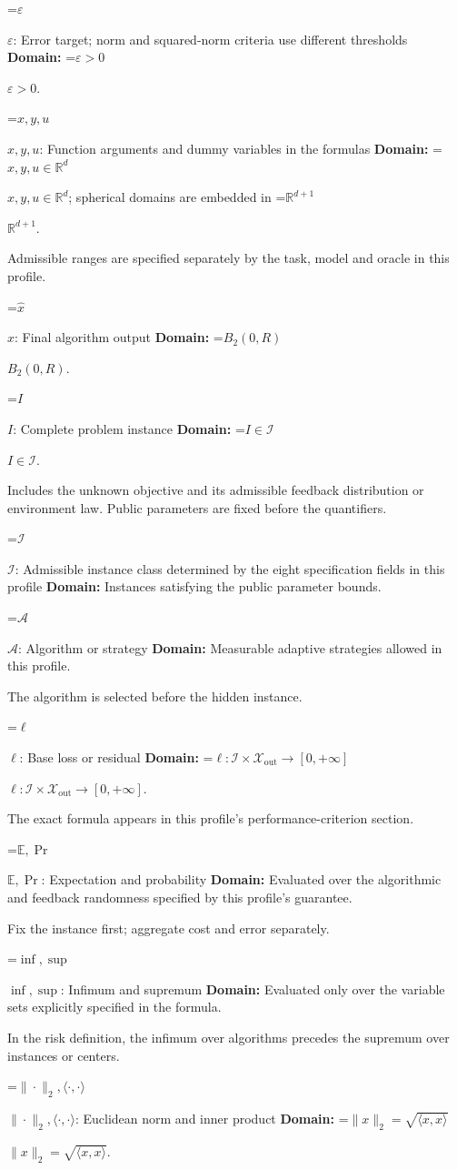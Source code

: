 \documentclass[10pt,a4paper]{article}
\newcommand{\AtlasMath}[1]{\par\begingroup\centering\setbox0=\hbox{$\displaystyle #1$}\ifdim\wd0>1.4\linewidth\typeout{ATLAS WIDE FORMULA: \the\wd0}\fi\ifdim\wd0>\linewidth\resizebox{\linewidth}{!}{\box0}\else\box0\fi\par\endgroup}
\newcommand{\AtlasInlineMath}[1]{\begingroup\setbox0=\hbox{$#1$}\ifdim\wd0>.4\linewidth\endgroup\AtlasMath{#1}\else\endgroup$#1$\fi}
\begin{document}
\AtlasInlineMath{\varepsilon}: Error target; norm and squared-norm criteria use different thresholds \textbf{Domain:} \AtlasInlineMath{\varepsilon>0}.

\AtlasInlineMath{x,y,u}: Function arguments and dummy variables in the formulas \textbf{Domain:} \AtlasInlineMath{x,y,u\in\mathbb{R}^d}; spherical domains are embedded in \AtlasInlineMath{\mathbb{R}^{d+1}}.

Admissible ranges are specified separately by the task, model and oracle in this profile.

\AtlasInlineMath{\widehat{x}}: Final algorithm output \textbf{Domain:} \AtlasInlineMath{B_2(0,R)}.

\AtlasInlineMath{I}: Complete problem instance \textbf{Domain:} \AtlasInlineMath{I\in\mathcal{I}}.

Includes the unknown objective and its admissible feedback distribution or environment law. Public parameters are fixed before the quantifiers.

\AtlasInlineMath{\mathcal{I}}: Admissible instance class determined by the eight specification fields in this profile \textbf{Domain:} Instances satisfying the public parameter bounds.

\AtlasInlineMath{\mathcal{A}}: Algorithm or strategy \textbf{Domain:} Measurable adaptive strategies allowed in this profile.

The algorithm is selected before the hidden instance.

\AtlasInlineMath{\ell}: Base loss or residual \textbf{Domain:} \AtlasInlineMath{\ell:\mathcal{I}\times\mathcal{X}_{\mathrm{out}}\to[0,+\infty]}.

The exact formula appears in this profile's performance-criterion section.

\AtlasInlineMath{\mathbb{E},\Pr}: Expectation and probability \textbf{Domain:} Evaluated over the algorithmic and feedback randomness specified by this profile's guarantee.

Fix the instance first; aggregate cost and error separately.

\AtlasInlineMath{\inf,\sup}: Infimum and supremum \textbf{Domain:} Evaluated only over the variable sets explicitly specified in the formula.

In the risk definition, the infimum over algorithms precedes the supremum over instances or centers.

\AtlasInlineMath{\|\cdot\|_2,\langle\cdot,\cdot\rangle}: Euclidean norm and inner product \textbf{Domain:} \AtlasInlineMath{\|x\|_2=\sqrt{\langle x,x\rangle}}.
\end{document}
